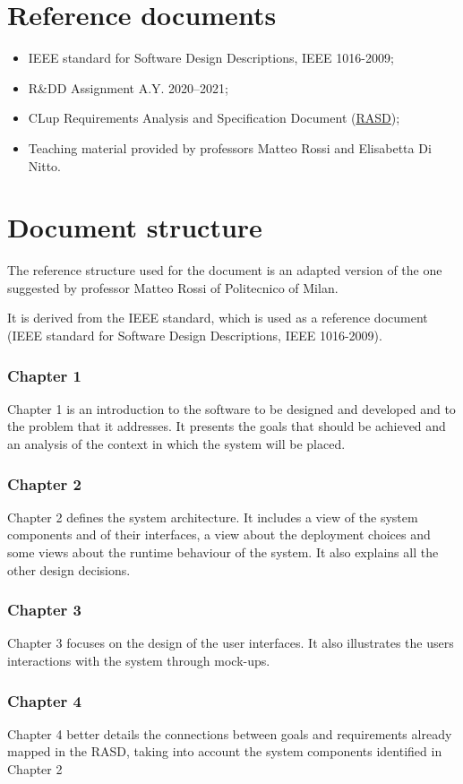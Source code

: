 \documentclass[a4paper,oneside,11pt]{book}
\begin{document}
    \section{Reference documents}
    \begin{itemize}
        \item IEEE standard for Software Design Descriptions, IEEE 1016-2009;
        \item R\&DD Assignment A.Y. 2020--2021;
        \item CLup Requirements Analysis and Specification Document (\href{run:../DeliveryFolder/RASD2.pdf}{RASD});
        \item Teaching material provided by professors Matteo Rossi and Elisabetta Di Nitto.
    \end{itemize}

    \section{Document structure}
    The reference structure used for the document is an adapted version of the one suggested by professor Matteo Rossi of Politecnico of Milan. \par It is derived from the IEEE standard, which is used as a reference document (IEEE standard for Software Design Descriptions, IEEE 1016-2009).
    \subsubsection{Chapter 1} 
    Chapter 1 is an introduction to the software to be designed and developed and to the problem that it addresses. It presents the goals that should be achieved and an analysis of the context in which the system will be placed.
    \subsubsection{Chapter 2} 
    Chapter 2 defines the system architecture. It includes a view of the system components and of their interfaces, a view about the deployment choices and some views about the runtime behaviour of the system. It also explains all the other design decisions.
    \subsubsection{Chapter 3} 
    Chapter 3 focuses on the design of the user interfaces. It also illustrates the users interactions with the system through mock-ups.
    \subsubsection{Chapter 4} 
    Chapter 4 better details the connections between goals and requirements already mapped in the RASD, taking into account the system components identified in Chapter 2
\end{document}
